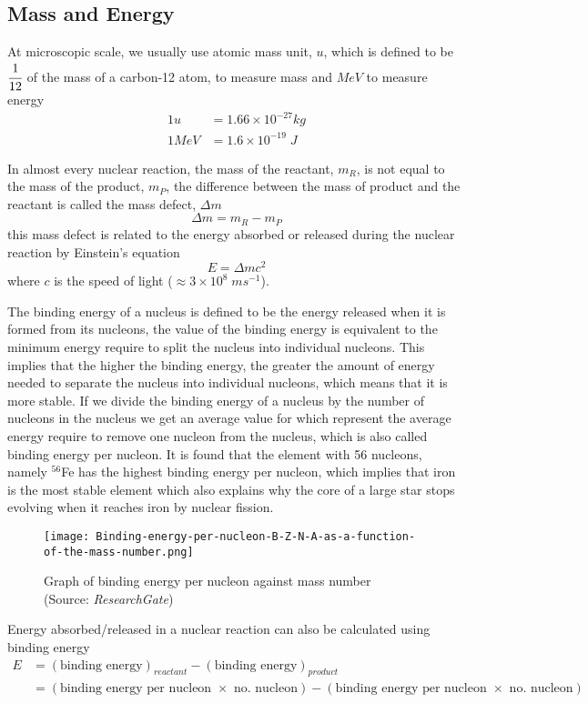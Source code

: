 \documentclass{article}
\begin{document}
 \subsection{Mass and Energy}


At microscopic scale, we usually use atomic mass unit, $u$, which is defined to be $\cfrac{1}{12}$ of the mass of a carbon-12 atom, to measure mass and $MeV$ to measure energy
\begin{align*}
    1u&=1.66\times 10^{-27}kg \\ 1MeV&=1.6\times10^{-19}\;J
\end{align*}

In almost every nuclear reaction, the mass of the reactant, $m_R$, is not equal to the mass of the product, $m_P$, the difference between the mass of product and the reactant is called the mass defect, $\Delta m$
$$\Delta m=m_R-m_P$$
this mass defect is related to the energy absorbed or released during the nuclear reaction by Einstein's equation
$$E=\Delta m c^2$$
where $c$ is the speed of light ($\approx 3\times 10^{8}\;ms^{-1}$). 

The binding energy of a nucleus is defined to be the energy released when it is formed from its nucleons, the value of the binding energy is equivalent to the minimum energy require to split the nucleus into individual nucleons. This implies that the higher the binding energy, the greater the amount of energy needed to separate the nucleus into individual nucleons, which means that it is more stable. If we divide the binding energy of a nucleus by the number of nucleons in the nucleus we get an average value for which represent the average energy require to remove one nucleon from the nucleus, which is also called binding energy per nucleon. It is found that the element with 56 nucleons, namely $^{56}$Fe has the highest binding energy per nucleon, which implies that iron is the most stable element which also explains why the core of a large star stops evolving when it reaches iron by nuclear fission.

\begin{figure}[H]
    \centering
    \captionsetup{justification=centering,margin=2cm}
    \texttt{[image: Binding-energy-per-nucleon-B-Z-N-A-as-a-function-of-the-mass-number.png]}
    \caption*{Graph of binding energy per nucleon against mass number \\ (Source: \textit{ResearchGate})}
\end{figure}
Energy absorbed/released in a nuclear reaction can also be calculated using binding energy
\begin{align*}
    E&=(\text{binding energy})_{reactant}-(
    \text{binding energy})_{product} \\ 
    &=(\text{binding energy per nucleon $\times$ no. nucleon})-(\text{binding energy per nucleon $\times$ no. nucleon})
\end{align*}
\end{document}
